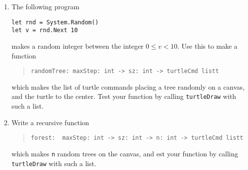 \begin{enumerate}
\item The following program
\begin{lstlisting}
let rnd = System.Random()
let v = rnd.Next 10
\end{lstlisting}
makes a random integer between the integer $0\leq v < 10$. Use this to make a function
\begin{quote}
  \lstinline{randomTree: maxStep: int -> sz: int -> turtleCmd listt}
\end{quote}
which makes the list of turtle commands placing a tree randomly on a canvas, and the turtle to the center. Test your function by calling \lstinline{turtleDraw} with such a list.
\item Write a recursive function
\begin{quote}
  \lstinline{forest:  maxStep: int -> sz: int -> n: int -> turtleCmd listt}
\end{quote}
which makes \lstinline{n} random trees on the canvas, and est your function by calling \lstinline{turtleDraw} with such a list.
\end{enumerate}
